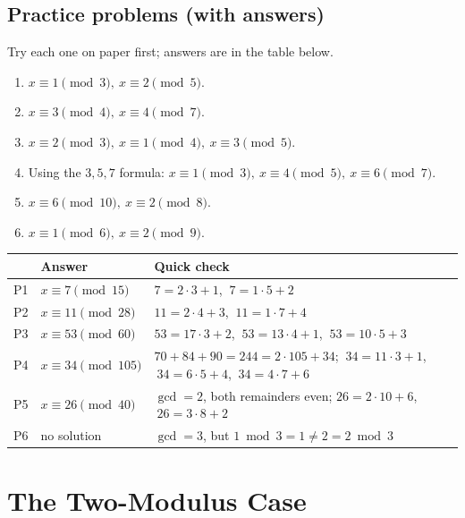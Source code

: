 \documentclass[11pt]{article}
\theoremstyle{definition}
\theoremstyle{remark}
\begin{document}
\subsection{Practice problems (with answers)}

Try each one on paper first; answers are in the table below.

\begin{enumerate}[label=\textbf{P\arabic*.},leftmargin=2.2em,itemsep=2pt]
\item $x\equiv1\pmod3,\ x\equiv2\pmod5$.
\item $x\equiv3\pmod4,\ x\equiv4\pmod7$.
\item $x\equiv2\pmod3,\ x\equiv1\pmod4,\ x\equiv3\pmod5$.
\item Using the $3,5,7$ formula: $x\equiv1\pmod3,\ x\equiv4\pmod5,\ x\equiv6\pmod7$.
\item $x\equiv6\pmod{10},\ x\equiv2\pmod8$.
\item $x\equiv1\pmod6,\ x\equiv2\pmod9$.
\end{enumerate}

\begin{center}
\renewcommand{\arraystretch}{1.3}
\begin{tabular}{cp{3.4cm}p{9cm}}
\toprule
& \textbf{Answer} & \textbf{Quick check} \\
\midrule
P1 & $x\equiv7\pmod{15}$ & $7=2\cdot3+1$, $\ 7=1\cdot5+2$ \\
P2 & $x\equiv11\pmod{28}$ & $11=2\cdot4+3$, $\ 11=1\cdot7+4$ \\
P3 & $x\equiv53\pmod{60}$ & $53=17\cdot3+2$, $\ 53=13\cdot4+1$, $\ 53=10\cdot5+3$ \\
P4 & $x\equiv34\pmod{105}$ & $70+84+90=244=2\cdot105+34$; $\ 34=11\cdot3+1$, $\ 34=6\cdot5+4$, $\ 34=4\cdot7+6$ \\
P5 & $x\equiv26\pmod{40}$ & $\gcd=2$, both remainders even; $26=2\cdot10+6$, $\ 26=3\cdot8+2$ \\
P6 & no solution & $\gcd=3$, but $1\bmod3=1\ne2=2\bmod3$ \\
\bottomrule
\end{tabular}
\end{center}


\section{The Two-Modulus Case}
\end{document}
